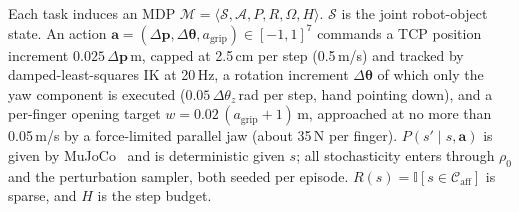 \documentclass[conference]{IEEEtran}
\begin{document}
Each task induces an MDP $\mathcal{M} = \langle \mathcal{S}, \mathcal{A}, P, R, \Omega, H \rangle$. $\mathcal{S}$ is the joint robot-object state. An action $\mathbf{a} = (\Delta\mathbf{p}, \Delta\boldsymbol{\theta}, a_{\text{grip}}) \in [-1,1]^7$ commands a TCP position increment $0.025\,\Delta\mathbf{p}$\,m, capped at 2.5\,cm per step (0.5\,m/s) and tracked by damped-least-squares IK at 20\,Hz, a rotation increment $\Delta\boldsymbol{\theta}$ of which only the yaw component is executed ($0.05\,\Delta\theta_z$\,rad per step, hand pointing down), and a per-finger opening target $w = 0.02\,(a_{\text{grip}} + 1)$\,m, approached at no more than 0.05\,m/s by a force-limited parallel jaw (about 35\,N per finger). $P(s' \mid s, \mathbf{a})$ is given by MuJoCo~\cite{todorov2012mujoco} and is deterministic given $s$; all stochasticity enters through $\rho_0$ and the perturbation sampler, both seeded per episode. $R(s) = \mathbb{I}[s \in \mathcal{C}_{\text{aff}}]$ is sparse, and $H$ is the step budget.
\end{document}
